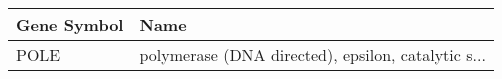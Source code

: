 \begin{tabular}{ll}
\toprule
Gene Symbol &                                               Name \\
\midrule
       POLE & polymerase (DNA directed), epsilon, catalytic s... \\
\bottomrule
\end{tabular}
